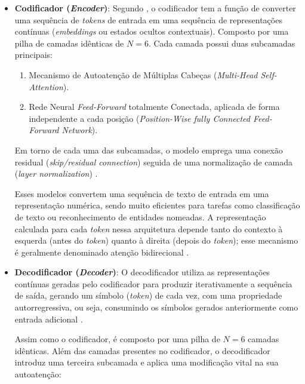 \documentclass[
    12pt,                %
    openright,           %
    oneside,             %
    a4paper,             %
    english,             %
    brazil               %
]{abntex2}
\begin{document}
\begin{itemize}
\begin{itemize}
  \item \textbf{Codificador (\textit{Encoder})}: 
Segundo , o codificador tem a função de converter uma sequência de \textit{tokens} de entrada em uma sequência de representações contínuas (\textit{embeddings} ou estados ocultos contextuais).
Composto por uma pilha de camadas idênticas de $N = 6$.
Cada camada possui duas subcamadas principais:

\begin{enumerate}
  \item Mecanismo de Autoatenção de Múltiplas Cabeças (\textit{Multi-Head Self-Attention}).
  \item Rede Neural \textit{Feed-Forward} totalmente Conectada, aplicada de forma independente a cada posição (\textit{Position-Wise fully Connected Feed-Forward Network}).
\end{enumerate}

\par
Em torno de cada uma das subcamadas, o modelo emprega uma conexão residual (\textit{skip/residual connection}) seguida de uma normalização de camada (\textit{layer normalization}) \cite{vaswani2017attention, tunstall2022natural}.
\par
Esses modelos convertem uma sequência de texto de entrada em uma representação numérica, sendo muito eficientes para tarefas como classificação de texto ou reconhecimento de entidades nomeadas. A representação calculada para cada \textit{token} nessa arquitetura depende tanto do contexto à esquerda (antes do \textit{token}) quanto à direita (depois do \textit{token}); esse mecanismo é geralmente denominado atenção bidirecional \cite{tunstall2022natural}.
  \item \textbf{Decodificador (\textit{Decoder})}:
O decodificador utiliza as representações contínuas geradas pelo codificador para produzir iterativamente a sequência de saída, gerando um símbolo (\textit{token}) de cada vez, com uma propriedade autorregressiva, ou seja, consumindo os símbolos gerados anteriormente como entrada adicional \cite{vaswani2017attention, tunstall2022natural}.
\par
Assim como o codificador, é composto por uma pilha de $N = 6$ camadas idênticas.
Além das camadas presentes no codificador, o decodificador introduz uma terceira subcamada e aplica uma modificação vital na sua autoatenção:


\end{itemize}
\end{itemize}
\end{document}
